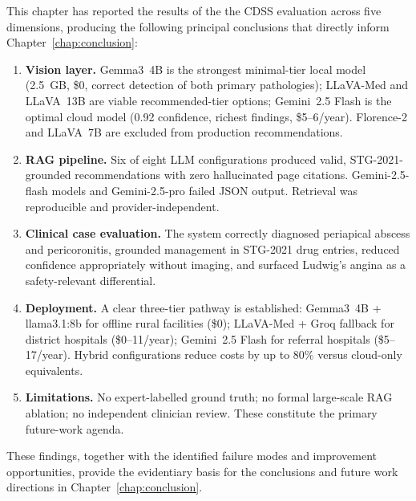\documentclass[12pt,a4paper]{report}
\begin{document}
This chapter has reported the results of the the CDSS evaluation across five
dimensions, producing the following principal conclusions that directly inform
Chapter~\ref{chap:conclusion}:

\begin{enumerate}

\item \textbf{Vision layer.} Gemma3~4B is the strongest minimal-tier local model
(2.5~GB, \$0, correct detection of both primary pathologies); LLaVA-Med and
LLaVA~13B are viable recommended-tier options; Gemini~2.5 Flash is the optimal
cloud model (0.92 confidence, richest findings, \$5--6/year). Florence-2 and
LLaVA~7B are excluded from production recommendations.

\item \textbf{RAG pipeline.} Six of eight LLM configurations produced valid,
STG-2021-grounded recommendations with zero hallucinated page citations.
Gemini-2.5-flash models and Gemini-2.5-pro failed JSON output. Retrieval was reproducible and provider-independent.

\item \textbf{Clinical case evaluation.} The system correctly diagnosed
periapical abscess and pericoronitis, grounded management in STG-2021 drug
entries, reduced confidence appropriately without imaging, and surfaced
Ludwig's angina as a safety-relevant differential.

\item \textbf{Deployment.} A clear three-tier pathway is established:
Gemma3~4B + llama3.1:8b for offline rural facilities (\$0);
LLaVA-Med + Groq fallback for district hospitals (\$0--11/year);
Gemini~2.5 Flash for referral hospitals (\$5--17/year). Hybrid configurations
reduce costs by up to 80\% versus cloud-only equivalents.

\item \textbf{Limitations.} No expert-labelled ground truth;
no formal large-scale RAG ablation; no independent clinician review. These
constitute the primary future-work agenda.

\end{enumerate}

These findings, together with the identified failure modes and improvement
opportunities, provide the evidentiary basis for the conclusions and future
work directions in Chapter~\ref{chap:conclusion}.


\end{document}
